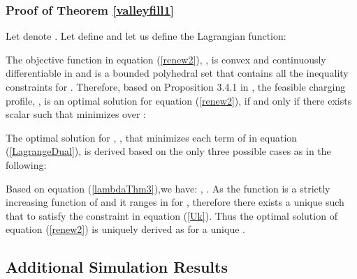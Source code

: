 \documentclass[12pt,draftcls,onecolumn]{IEEEtran}
\begin{document}
\subsubsection{Proof of Theorem \ref{valleyfill1}} \label{A3}
\indent Let denote . Let define  and let us define the Lagrangian function:

\indent The objective function in equation (\ref{renew2}), , is convex and continuously differentiable in  and  is a bounded polyhedral set that contains all the inequality constraints for . Therefore, based on Proposition 3.4.1 in \cite{B99}, the feasible charging profile, , is an optimal solution for equation (\ref{renew2}), if and only if there exists scalar  such that  minimizes  over :

\indent The optimal solution for , , that minimizes each term of  in equation (\ref{LagrangeDual}), is derived based on the only three possible cases as in the following:

\indent Based on equation (\ref{lambdaThm3}),we have: , . As the function  is a strictly increasing function of  and it ranges in  for , therefore there exists a unique  such that  to satisfy the constraint in equation (\ref{Uk}). Thus the optimal solution of equation (\ref{renew2}) is uniquely derived as  for a unique .\\
\subsection{Additional Simulation Results}
\end{document}
